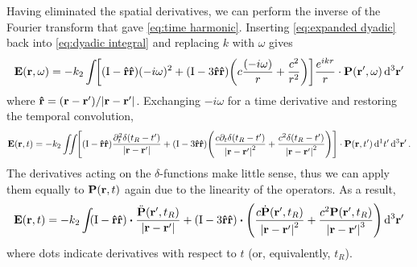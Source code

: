 Having eliminated the spatial derivatives, we can perform the inverse of the Fourier transform that gave \cref{eq:time harmonic}.
Inserting \cref{eq:expanded dyadic} back into \cref{eq:dyadic integral} and replacing $k$ with $\omega$ gives
\begin{equation}
  \vb{E}(\vb{r}, \omega) = -k_2 \int_{} \kern0.1em \qty[ \qty(\mathrm{I} - \vu{r}\vu{r})(-i \omega)^2 + \qty(\mathrm{I} - 3\vu{r}\vu{r})\qty(c\frac{(-i\omega)}{r} + \frac{c^2}{r^2})] \frac{e^{ikr}}{r} \cdot \vb{P}(\vb{r}', \omega) \dd[3]{\vb{r}'}
\end{equation}
where $\vu{r} = (\vb{r} - \vb{r}')/\abs{\vb{r} - \vb{r}'}$.
Exchanging $-i\omega$ for a time derivative and restoring the temporal convolution,
\begin{equation}
  \vb{E}(\vb{r}, t) = -k_2 \iint_{} \kern0.1em \qty[
    (\mathrm{I} - \vu{r}\vu{r}) \frac{\partial_t^2 \delta(t_R - t')}{\abs{\vb{r} - \vb{r}'}} +
    (\mathrm{I} - 3\vu{r}\vu{r}) \qty(
      \frac{c \partial_t \delta(t_R - t')}{\abs{\vb{r} - \vb{r}'}^2} +
      \frac{c^2 \delta(t_R - t')}{\abs{\vb{r} - \vb{r}'}^2}
    )
  ] \cdot \vb{P}(\vb{r}, t') \dd[1]{t'} \dd[3]{\vb{r}'}.
\end{equation}
The derivatives acting on the $\delta$-functions make little sense, thus we can apply them equally to $\vb{P}(\vb{r}, t)$ again due to the linearity of the operators.
As a result,
\begin{equation}
  \vb{E}(\vb{r}, t) = -k_2 \int_{} \kern0.1em
  (\mathrm{I} - \vu{r}\vu{r}) \boldsymbol{\cdot} \frac{\ddot{\vb{P}}(\vb{r'}, t_R)}{\abs{\vb{r}-\vb{r}'}} +
  (\mathrm{I} - 3\vu{r}\vu{r}) \boldsymbol{\cdot} \qty(
    \frac{c \dot{\vb{P}}(\vb{r}', t_R)}{\abs{\vb{r} - \vb{r}'}^2} +
    \frac{c^2 \vb{P}(\vb{r}', t_R)}{\abs{\vb{r} - \vb{r}'}^3}
  ) \dd[3]{\vb{r}'}
\end{equation}
where dots indicate derivatives with respect to $t$ (or, equivalently, $t_R$).
